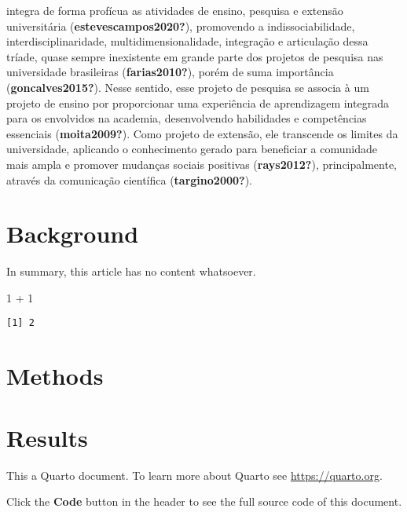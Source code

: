 \documentclass[
  a4paper,
]{article}
\newenvironment{Shaded}{\begin{snugshade}}{\end{snugshade}}
\newcommand{\DecValTok}[1]{\textcolor[rgb]{0.68,0.00,0.00}{#1}}
\newcommand{\SpecialCharTok}[1]{\textcolor[rgb]{0.37,0.37,0.37}{#1}}
\begin{document}
integra de forma profícua as atividades de ensino, pesquisa e extensão
universitária (\textbf{estevescampos2020?}), promovendo a
indissociabilidade, interdisciplinaridade, multidimensionalidade,
integração e articulação dessa tríade, quase sempre inexistente em
grande parte dos projetos de pesquisa nas universidade brasileiras
(\textbf{farias2010?}), porém de suma importância
(\textbf{goncalves2015?}). Nesse sentido, esse projeto de pesquisa se
associa à um projeto de ensino por proporcionar uma experiência de
aprendizagem integrada para os envolvidos na academia, desenvolvendo
habilidades e competências essenciais (\textbf{moita2009?}). Como
projeto de extensão, ele transcende os limites da universidade,
aplicando o conhecimento gerado para beneficiar a comunidade mais ampla
e promover mudanças sociais positivas (\textbf{rays2012?}),
principalmente, através da comunicação científica
(\textbf{targino2000?}).


\section{Background}\label{background}

In summary, this article has no content whatsoever.

\begin{Shaded}
\begin{Highlighting}[]
\DecValTok{1} \SpecialCharTok{+} \DecValTok{1}
\end{Highlighting}
\end{Shaded}

\begin{verbatim}
[1] 2
\end{verbatim}


\section{Methods}\label{methods}


\section{Results}\label{results}

This a Quarto document. To learn more about Quarto see
\url{https://quarto.org}.

Click the \textbf{Code} button in the header to see the full source code
of this document.
\end{document}
